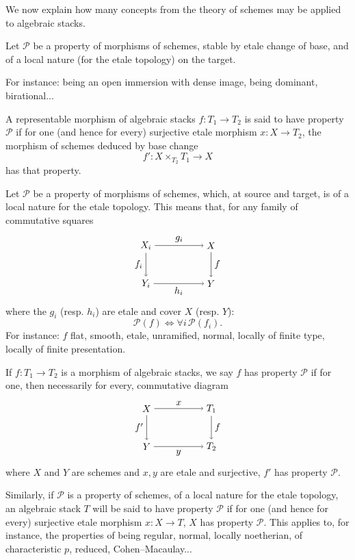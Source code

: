 \documentclass[10pt]{article}
\begin{document}
We now explain how many concepts from the theory of schemes may be applied to algebraic stacks.

Let $\mathcal P$ be a property of morphisms of schemes, stable by etale change of base, and of a local nature (for the etale topology) on the target.

For instance: being an open immersion with dense image, being dominant, birational...

A representable morphism of algebraic stacks $f:T_1\to T_2$ is said to have property $\mathcal P$ if for one (and hence for every) surjective etale morphism $x:X\to T_2$, the morphism of schemes deduced by base change
\[
f':X\times_{T_2}T_1\longrightarrow X
\]
has that property.

Let $\mathcal P$ be a property of morphisms of schemes, which, at source and target, is of a local nature for the etale topology. This means that, for any family of commutative squares
\[
\begin{tikzpicture}[baseline=(current bounding box.center), node distance=1.6cm]
\node (Xi) at (0,1.4) {$X_i$};
\node (X) at (2.4,1.4) {$X$};
\node (Yi) at (0,0) {$Y_i$};
\node (Y) at (2.4,0) {$Y$};
\draw[->] (Xi) -- node[above] {$g_i$} (X);
\draw[->] (Xi) -- node[left] {$f_i$} (Yi);
\draw[->] (X) -- node[right] {$f$} (Y);
\draw[->] (Yi) -- node[below] {$h_i$} (Y);
\end{tikzpicture}
\]
where the $g_i$ (resp. $h_i$) are etale and cover $X$ (resp. $Y$):
\[
\mathcal P(f)\Longleftrightarrow \forall i\,\mathcal P(f_i).
\]
For instance: $f$ flat, smooth, etale, unramified, normal, locally of finite type, locally of finite presentation.

If $f:T_1\to T_2$ is a morphism of algebraic stacks, we say $f$ has property $\mathcal P$ if for one, then necessarily for every, commutative diagram
\[
\begin{tikzpicture}[baseline=(current bounding box.center)]
\node (X) at (0,1.4) {$X$};
\node (T1) at (2.4,1.4) {$T_1$};
\node (Y) at (0,0) {$Y$};
\node (T2) at (2.4,0) {$T_2$};
\draw[->] (X) -- node[above] {$x$} (T1);
\draw[->] (X) -- node[left] {$f'$} (Y);
\draw[->] (T1) -- node[right] {$f$} (T2);
\draw[->] (Y) -- node[below] {$y$} (T2);
\end{tikzpicture}
\]
where $X$ and $Y$ are schemes and $x,y$ are etale and surjective, $f'$ has property $\mathcal P$.

Similarly, if $\mathcal P$ is a property of schemes, of a local nature for the etale topology, an algebraic stack $T$ will be said to have property $\mathcal P$ if for one (and hence for every) surjective etale morphism $x:X\to T$, $X$ has property $\mathcal P$. This applies to, for instance, the properties of being regular, normal, locally noetherian, of characteristic $p$, reduced, Cohen--Macaulay...
\end{document}
